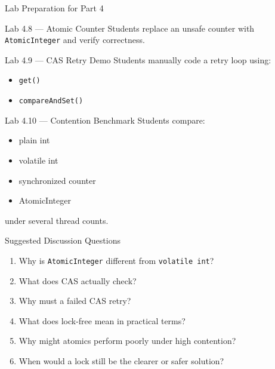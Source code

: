 \documentclass[aspectratio=169,11pt]{beamer}
\begin{document}
	\begin{frame}{Lab Preparation for Part 4}
		\begin{block}{Lab 4.8 --- Atomic Counter}
			Students replace an unsafe counter with \texttt{AtomicInteger} and verify correctness.
		\end{block}
		
		\vspace{0.25cm}
		
		\begin{block}{Lab 4.9 --- CAS Retry Demo}
			Students manually code a retry loop using:
			\begin{itemize}
				\item \texttt{get()}
				\item \texttt{compareAndSet()}
			\end{itemize}
		\end{block}
		
		\vspace{0.25cm}
		
		\begin{block}{Lab 4.10 --- Contention Benchmark}
			Students compare:
			\begin{itemize}
				\item plain int
				\item volatile int
				\item synchronized counter
				\item AtomicInteger
			\end{itemize}
			under several thread counts.
		\end{block}
	\end{frame}
	
	\begin{frame}{Suggested Discussion Questions}
		\begin{enumerate}
			\item Why is \texttt{AtomicInteger} different from \texttt{volatile int}?
			\item What does CAS actually check?
			\item Why must a failed CAS retry?
			\item What does lock-free mean in practical terms?
			\item Why might atomics perform poorly under high contention?
			\item When would a lock still be the clearer or safer solution?
		\end{enumerate}
	\end{frame}
	
\end{document}
